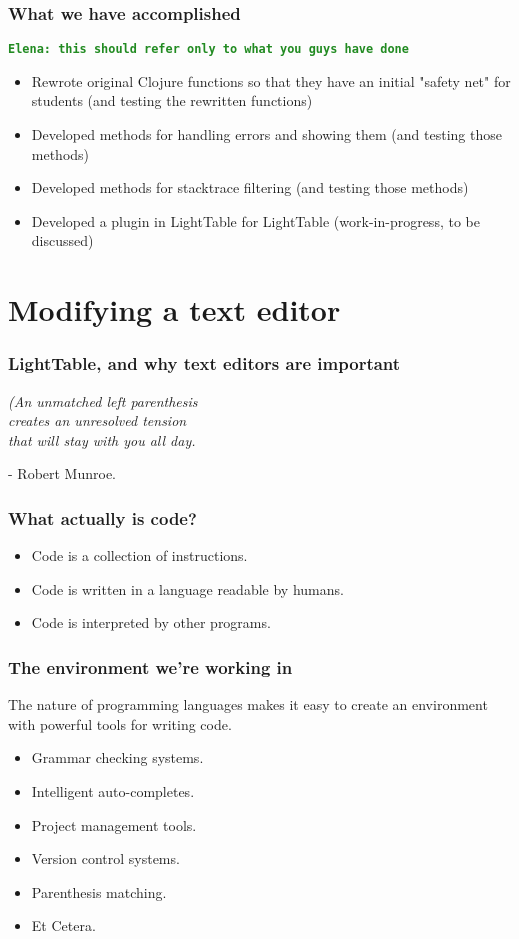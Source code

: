 \documentclass{beamer}
\newcommand{\comment}[1]{{\bf \tt  {#1}}}
\newcommand{\emcomment}[1]{\textcolor{ForestGreen}{\comment{Elena: {#1}}}}
\begin{document}
\begin{frame}[fragile]
\frametitle{What we have accomplished}
\emcomment{this should refer only to what you guys have done}
\begin{itemize}
\item Rewrote original Clojure functions so that they have an initial "safety net" for students (and testing the rewritten functions)
\item Developed methods for handling errors and showing them (and testing those methods)
\item Developed methods for stacktrace filtering (and testing those methods)
\item Developed a plugin in LightTable for LightTable (work-in-progress, to be discussed)
\end{itemize}
\end{frame}

\section{Modifying a text editor}

\begin{frame}
\frametitle{LightTable, and why text editors are important}
	\begin{center}
	{\em (An unmatched left parenthesis\\ creates an unresolved tension\\ that will stay with you all day.}	

	\vspace*{2\baselineskip}
	- Robert Munroe.
	\end{center}
\end{frame}

\begin{frame}
\frametitle{What actually is code?}
	\begin{itemize}
	\item Code is a collection of instructions.
	\item Code is written in a language readable by humans.
	\item Code is interpreted by other programs.
	\end{itemize}
\end{frame}

\begin{frame}
\frametitle{The environment we're working in}
	The nature of programming languages makes it easy to create an environment with powerful tools for writing code.
	{\em
	\begin{itemize}
	\item Grammar checking systems.
	\item Intelligent auto-completes.
	\item Project management tools.
	\item Version control systems.
	\item Parenthesis matching.
	\item Et Cetera.
	\end{itemize}
	}
\end{frame}
\end{document}
